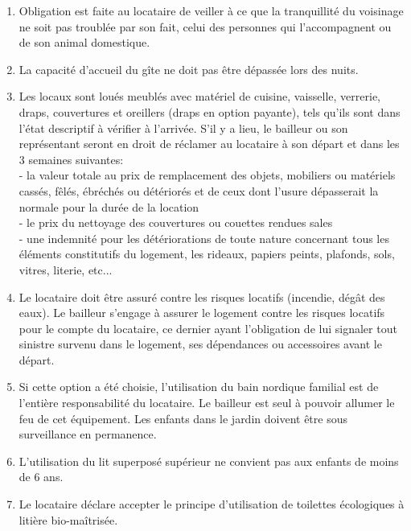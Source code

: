 \documentclass[a4paper,11pt]{article}
\begin{document}
\begin{enumerate}
\item Obligation est faite au locataire de veiller à ce que la tranquillité du voisinage ne soit pas troublée par son fait, celui des personnes qui l'accompagnent ou de son animal domestique.

\item La capacité d'accueil du gîte ne doit pas être dépassée lors des nuits.



\item Les locaux sont loués meublés avec matériel de cuisine, vaisselle, verrerie, draps, couvertures et oreillers (draps en option payante), tels qu’ils sont dans l’état descriptif à vérifier à l'arrivée.
S’il y a lieu, le bailleur ou son représentant seront en droit de réclamer au locataire à son départ et dans les 3 semaines suivantes:\\
- la valeur totale au prix de remplacement des objets, mobiliers ou matériels cassés, fêlés, ébréchés ou détériorés et de ceux dont l’usure dépasserait la normale pour la durée de la location\\
- le prix du nettoyage des couvertures ou couettes rendues sales\\
- une indemnité pour les détériorations de toute nature concernant tous les éléments constitutifs du logement, les rideaux, papiers peints, plafonds, sols, vitres, literie, etc...\\



\item Le locataire doit être assuré contre les risques locatifs (incendie, dégât des eaux). 
Le bailleur s'engage à assurer le logement contre les risques locatifs pour le compte du locataire, ce dernier ayant l'obligation de lui signaler  tout sinistre survenu dans le logement, ses dépendances ou accessoires avant le départ.

\item Si cette option a été choisie, l'utilisation du bain nordique familial est de l'entière responsabilité du locataire. Le bailleur est seul à pouvoir allumer le feu de cet équipement. Les enfants dans le jardin doivent être sous surveillance en permanence. 



\item L'utilisation du lit superposé supérieur ne convient pas aux enfants de moins de 6 ans.

\item Le locataire déclare accepter le principe d'utilisation de toilettes écologiques à litière bio-maîtrisée.


\end{enumerate}
\end{document}

